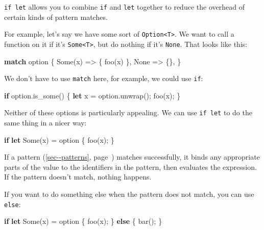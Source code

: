 \documentclass[a4paper,]{book}
\renewcommand*{\hyperlink}[2]{%
 #2 (\autoref{#1}, page~\pageref{#1})}
\newenvironment{Shaded}{\begin{snugshade}}{\end{snugshade}}
\newcommand{\KeywordTok}[1]{\textcolor[rgb]{0.13,0.29,0.53}{\textbf{{#1}}}}
\newcommand{\ConstantTok}[1]{\textcolor[rgb]{0.00,0.00,0.00}{{#1}}}
\newcommand{\NormalTok}[1]{{#1}}
\begin{document}
\texttt{if\ let} allows you to combine \texttt{if} and \texttt{let}
together to reduce the overhead of certain kinds of pattern matches.

For example, let's say we have some sort of
\texttt{Option\textless{}T\textgreater{}}. We want to call a function on
it if it's \texttt{Some\textless{}T\textgreater{}}, but do nothing if
it's \texttt{None}. That looks like this:

\begin{Shaded}
\begin{Highlighting}[]
\KeywordTok{match} \NormalTok{option \{}
    \ConstantTok{Some}\NormalTok{(x) => \{ foo(x) \},}
    \ConstantTok{None} \NormalTok{=> \{\},}
\NormalTok{\}}
\end{Highlighting}
\end{Shaded}

We don't have to use \texttt{match} here, for example, we could use
\texttt{if}:

\begin{Shaded}
\begin{Highlighting}[]
\KeywordTok{if} \NormalTok{option.is_some() \{}
    \KeywordTok{let} \NormalTok{x = option.unwrap();}
    \NormalTok{foo(x);}
\NormalTok{\}}
\end{Highlighting}
\end{Shaded}

Neither of these options is particularly appealing. We can use
\texttt{if\ let} to do the same thing in a nicer way:

\begin{Shaded}
\begin{Highlighting}[]
\KeywordTok{if} \KeywordTok{let} \ConstantTok{Some}\NormalTok{(x) = option \{}
    \NormalTok{foo(x);}
\NormalTok{\}}
\end{Highlighting}
\end{Shaded}

If a \protect\hyperlink{sec--patterns}{pattern} matches successfully, it
binds any appropriate parts of the value to the identifiers in the
pattern, then evaluates the expression. If the pattern doesn't match,
nothing happens.

If you want to do something else when the pattern does not match, you
can use \texttt{else}:

\begin{Shaded}
\begin{Highlighting}[]
\KeywordTok{if} \KeywordTok{let} \ConstantTok{Some}\NormalTok{(x) = option \{}
    \NormalTok{foo(x);}
\NormalTok{\} }\KeywordTok{else} \NormalTok{\{}
    \NormalTok{bar();}
\NormalTok{\}}
\end{Highlighting}
\end{Shaded}
\end{document}
